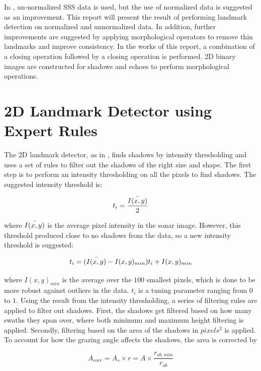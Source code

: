 In \cite{Al-Rawi2017LandmarkImages}, un-normalized SSS data is used, but the use of normalized data is suggested as an improvement. This report will present the result of performing landmark detection on normalized and unnormalized data. In addition, further improvements are suggested by applying morphological operators to remove thin landmarks and improve consistency. In the works of this report, a combination of a closing operation followed by a closing operation is performed. 2D binary images are constructed for shadows and echoes to perform morphological operations.  

\section{2D Landmark Detector using Expert Rules}

The 2D landmark detector, as in \cite{Leblond2019SonarProject}, finds shadows by intensity thresholding and uses a set of rules to filter out the shadows of the right size and shape. The first step is to perform an intensity thresholding on all the pixels to find shadows. The suggested intensity threshold is:

\begin{equation}
    t_i = \frac{\Bar{I(x,y)}}{2}
    \label{eq:orginal_int_thres}
\end{equation}

where $\Bar{I(x,y)}$ is the average pixel intensity in the sonar image. However, this threshold produced close to no shadows from the data, so a new intensity threshold is suggested:

\begin{equation}
    t_i = (\Bar{I(x,y)} - I(x,y)_{min}) t_i + I(x,y)_{min} 
\end{equation}

where $I(x,y)_{min}$ is the average over the $100$ smallest pixels, which is done to be more robust against outliers in the data. $t_i$ is a tuning parameter ranging from $0$ to $1$. Using the result from the intensity thresholding, a series of filtering rules are applied to filter out shadows. First, the shadows get filtered based on how many swaths they span over, where both minimum and maximum height filtering is applied. Secondly, filtering based on the area of the shadows in $pixels^2$ is applied. To account for how the grazing angle affects the shadows, the area is corrected by

\begin{equation}
    A_{corr} = A_s \times r = A \times \frac{r_{ob,min}}{r_{ob}}
    \label{eq:corrected_area}
\end{equation}

